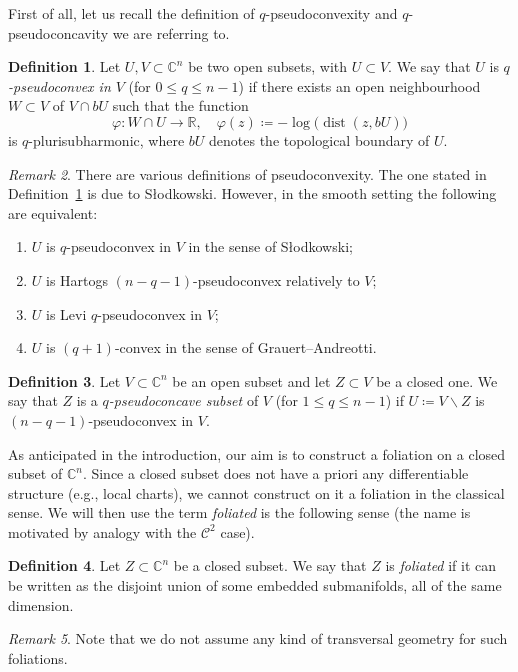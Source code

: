 \documentclass[reqno,oneside]{amsart}
\newcommand{\numberset}{\mathbb}
\newcommand{\R}{\numberset{R}}
\newcommand{\C}{\numberset{C}}
\renewcommand{\phi}{\varphi}
\DeclareMathOperator{\dist}{dist}
\theoremstyle{definition}
\newtheorem{definition}{Definition}[section]
\theoremstyle{plain}
\theoremstyle{remark}
\newtheorem{remark}[definition]{Remark}
\begin{document}
First of all, let us recall the definition of $q$-pseudoconvexity and $q$-pseudo\-concavity we are referring to.
\begin{definition}
\label{def:pseudoconvex}
	Let $U,V\subset\C^n$ be two open subsets, with $U\subset V$. We say that $U$ is \emph{$q$-pseudoconvex in $V$} (for $0\leq q\leq n-1$) if there exists an open neighbourhood $W\subset V$ of $V\cap bU$ such that the function
	\[
		\phi:W\cap U\to\R, \quad \phi(z)\coloneqq-\log\bigl(\dist(z,bU)\bigr)
	\]
	is $q$-plurisubharmonic, where $bU$ denotes the topological boundary of $U$.
\end{definition}
\begin{remark}
	There are various definitions of pseudoconvexity. The one stated in Definition~\ref{def:pseudoconvex} is due to Słodkowski. However, in the smooth setting the following are equivalent:
	\begin{enumerate}
		\item[(a)] $U$ is $q$-pseudoconvex in $V$ in the sense of Słodkowski;
		\item[(b)] $U$ is Hartogs $(n-q-1)$-pseudoconvex relatively to $V$;
		\item[(c)] $U$ is Levi $q$-pseudoconvex in $V$;
		\item[(d)] $U$ is $(q+1)$-convex in the sense of Grauert--Andreotti.
	\end{enumerate}
\end{remark}
\begin{definition}
\label{def:pseudoconcave}
	Let $V\subset\C^n$ be an open subset and let $Z\subset V$ be a closed one. We say that $Z$ is a \emph{$q$-pseudoconcave subset} of $V$ (for $1\leq q\leq n-1$) if $U\coloneqq V\smallsetminus Z$ is $(n-q-1)$-pseudoconvex in $V$.
\end{definition}

As anticipated in the introduction, our aim is to construct a foliation on a closed subset of $\C^n$. Since a closed subset does not have a priori any differentiable structure (e.g., local charts), we cannot construct on it a foliation in the classical sense. We will then use the term \emph{foliated} is the following sense (the name is motivated by analogy with the $\mathscr{C}^2$ case).
\begin{definition}
\label{def:foliated}
	Let $Z\subset\C^n$ be a closed subset. We say that $Z$ is \emph{foliated} if it can be written as the disjoint union of some embedded submanifolds, all of the same dimension.
\end{definition}
\begin{remark}
	Note that we do not assume any kind of transversal geometry for such foliations.
\end{remark}
\end{document}
